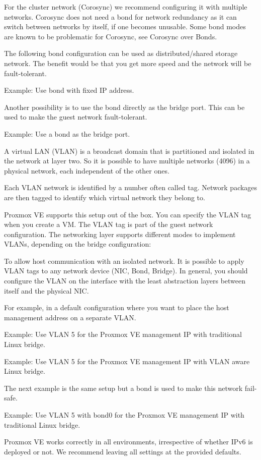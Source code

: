 For the cluster network (Corosync) we recommend configuring it with multiple networks. Corosync does not need a bond for network redundancy as it can switch between networks by itself, if one becomes unusable. Some bond modes are known to be problematic for Corosync, see Corosync over Bonds.

The following bond configuration can be used as distributed/shared storage network. The benefit would be that you get more speed and the network will be fault-tolerant.

Example: Use bond with fixed IP address.

Another possibility is to use the bond directly as the bridge port. This can be used to make the guest network fault-tolerant.

Example: Use a bond as the bridge port.

A virtual LAN (VLAN) is a broadcast domain that is partitioned and isolated in the network at layer two. So it is possible to have multiple networks (4096) in a physical network, each independent of the other ones.

Each VLAN network is identified by a number often called tag. Network packages are then tagged to identify which virtual network they belong to.

Proxmox VE supports this setup out of the box. You can specify the VLAN tag when you create a VM. The VLAN tag is part of the guest network configuration. The networking layer supports different modes to implement VLANs, depending on the bridge configuration:

To allow host communication with an isolated network. It is possible to apply VLAN tags to any network device (NIC, Bond, Bridge). In general, you should configure the VLAN on the interface with the least abstraction layers between itself and the physical NIC.

For example, in a default configuration where you want to place the host management address on a separate VLAN.

Example: Use VLAN 5 for the Proxmox VE management IP with traditional Linux bridge.

Example: Use VLAN 5 for the Proxmox VE management IP with VLAN aware Linux bridge.

The next example is the same setup but a bond is used to make this network fail-safe.

Example: Use VLAN 5 with bond0 for the Proxmox VE management IP with traditional Linux bridge.

Proxmox VE works correctly in all environments, irrespective of whether IPv6 is deployed or not. We recommend leaving all settings at the provided defaults.


